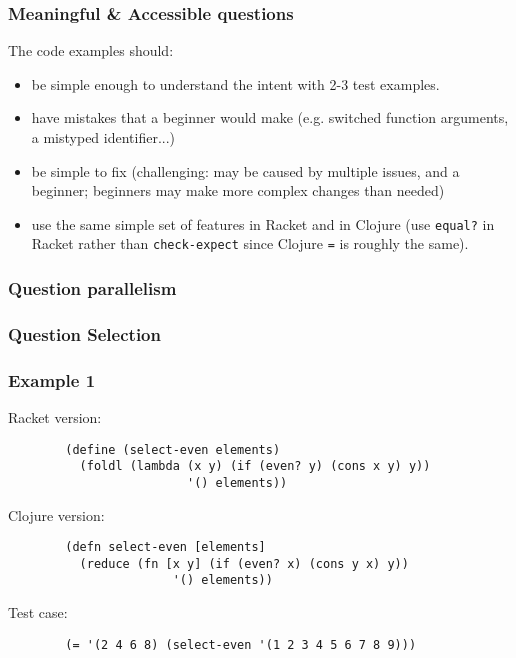\documentclass{beamer}
\begin{document}
\begin{frame}
	\frametitle{Meaningful \& Accessible questions}
The code examples should: 
	\begin{itemize}
		\item be simple enough to understand the intent with 2-3 test examples. 
		\item have mistakes that a beginner would make (e.g. switched function arguments, a mistyped identifier...) 
		\item be simple to fix (challenging: may  be caused by multiple issues, and a beginner; beginners may make more complex changes than needed)
		\item use the same simple set of features in Racket and in Clojure (use \texttt{equal?} in Racket rather than \texttt{check-expect} since Clojure {\tt =} is roughly the same). 
	\end{itemize}
\end{frame}

\begin{frame}
\frametitle{Question parallelism}
\end{frame}


\begin{frame}
\frametitle{Question Selection}
\end{frame}

\begin{frame}[fragile]
\frametitle{Example 1}
Racket version:
\begin{verbatim}
		(define (select-even elements) 
		  (foldl (lambda (x y) (if (even? y) (cons x y) y)) 
                         '() elements))
\end{verbatim}
Clojure version:  
\begin{verbatim}
		(defn select-even [elements] 
		  (reduce (fn [x y] (if (even? x) (cons y x) y))  
                       '() elements))
\end{verbatim}
Test case:
\begin{verbatim}
		(= '(2 4 6 8) (select-even '(1 2 3 4 5 6 7 8 9)))
\end{verbatim}
\end{frame}
\end{document}
